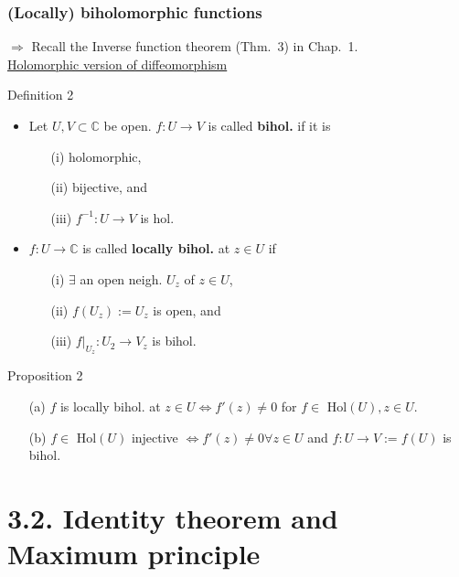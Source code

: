 \documentclass[10pt]{beamer}
\newcommand{\C}{\mathbb{C}}
\begin{document}
{\begin{frame}
\frametitle{(Locally) biholomorphic functions}
$\Rightarrow$ Recall the Inverse function theorem (Thm.~3) in Chap.~1.\\
\vspace{0.2cm}
\underline{Holomorphic version of diffeomorphism}
\vspace{0.2cm}
\begin{alertblock}{Definition 2}
\begin{itemize}
\item Let $U,V \subset \C$ be open. $f:U \rightarrow V$ is called \textbf{bihol.} if it is
\begin{itemize}
\item[(i)] holomorphic,
\item[(ii)] bijective, and
\item[(iii)] $f^{-1}:U \rightarrow V$ is hol.
\end{itemize}
\item $f:U \rightarrow \C$ is called \textbf{locally bihol.} at $z\in U$ if
\begin{itemize}
\item[(i)] $\exists$ an open neigh. $U_z$ of $z\in U$,
\item[(ii)] $f(U_z):=U_z$ is open,  and
\item[(iii)] $f|_{U_z}:U_2 \rightarrow V_z$ is bihol.
\end{itemize}
\end{itemize}
\end{alertblock}
\vspace{0.2cm}
\begin{block}{Proposition 2}
\begin{itemize}
\item[(a)] $f$ is locally bihol. at $z\in U \iff f'(z) \neq 0$ for $f\in$ Hol$(U), z \in U$.
\item[(b)] $f\in$ Hol$(U)$ injective $\iff f'(z) \neq 0 \forall z \in U$ and $f:U \rightarrow V:=f(U)$ is bihol.
\end{itemize}
\end{block}
\end{frame}

\section{3.2.  Identity theorem and Maximum principle}

}
\end{document}
